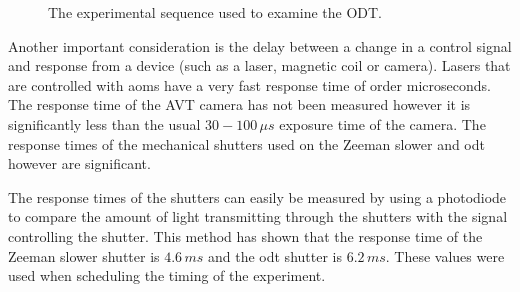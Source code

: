 \begin{figure}[H]
\caption{The experimental sequence used to examine the ODT.}
\label{fig:sequence}
\end{figure}

Another important consideration is the delay between a change in a control signal and response from a device (such as a laser, magnetic coil or camera). Lasers that are controlled with \glspl{aom} have a very fast response time of order microseconds. The response time of the AVT camera has not been measured however it is significantly less than the usual $30-100\,\unit{\mu s}$ exposure time of the camera. The response times of the mechanical shutters used on the Zeeman slower and \gls{odt} however are significant.

The response times of the shutters can easily be measured by using a photodiode to compare the amount of light transmitting through the shutters with the signal controlling the shutter. This method has shown that the response time of the Zeeman slower shutter is $4.6\,\unit{ms}$ and the \gls{odt} shutter is $6.2\,\unit{ms}$. These values were used when scheduling the timing of the experiment.
